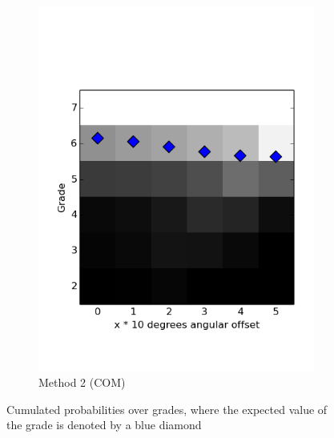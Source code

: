 \documentclass[a4paper,11pt]{report}
\begin{document}
\begin{figure}
\begin{subfigure}[b]{0.45\textwidth}
        \includegraphics[width=\textwidth]{figures/grade_cumulative_COM.png}
        \caption{Method 2 (COM)}
        \label{fig:cumulative2}
    \end{subfigure}
    \caption{Cumulated probabilities over grades, where the expected value of the grade is denoted by a blue diamond}
    \label{fig:cumulative_probs}
\end{figure}
\end{document}
